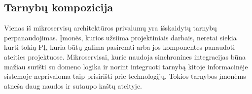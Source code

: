 \subsection{Tarnybų kompozicija}

Vienas iš mikroservisų architektūros privalumų yra išskaidytų tarnybų perpanaudojimas. Įmonės, kurios užsiima projektiniais darbais,
neretai siekia kurti tokią PĮ, kuria būtų galima pasiremti arba jos komponentes panaudoti ateities projektuose. Mikroservisai, kurie naudoja 
sinchronines integracijas būna mažiau surišti su domeno logika ir norint integruoti tarnybą kitoje informacinėje sistemoje
neprivaloma taip prisirišti prie technologijų. Tokios tarnybos įmonėms atneša daug naudos ir sutaupo kaštų ateityje.

